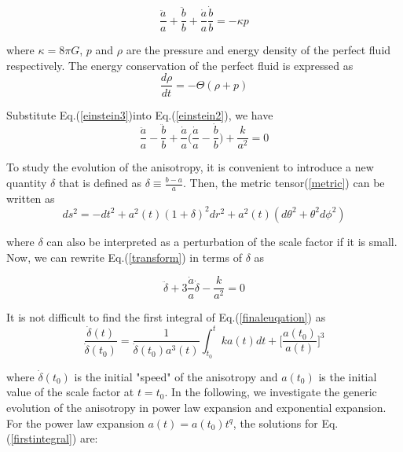 \documentclass[a4paper,preprint]{revtex4}
\begin{document}
\begin{equation}\label{einstein3}
  \frac{\ddot{a}}{a}+\frac{\ddot{b}}{b}+\frac{\dot{a}}{a}\frac{\dot{b}}{b}=-\kappa
  p
\end{equation}

\noindent where $\kappa=8\pi G$, $p$ and $\rho$ are the pressure
and energy density of the perfect fluid respectively. The energy
conservation of the perfect fluid is expressed as
\begin{equation}\label{conservation}
\frac{d \rho}{dt}=-\Theta (\rho+p)
\end{equation}


\noindent Substitute Eq.(\ref{einstein3})into
Eq.(\ref{einstein2}), we have
\begin{equation}\label{transform}
\frac{\ddot{a}}{a}-\frac{\ddot{b}}{b}+\frac{\dot{a}}{a}\Bigg(\frac{\dot{a}}
{a}-\frac{\dot{b}}{b}\Bigg)+\frac{k}{a^2}=0
\end{equation}

\noindent To study the evolution of the anisotropy, it is
convenient to introduce a new quantity $\delta$ that is defined as
$\delta\equiv\frac{b-a}{a}$. Then, the metric tensor(\ref{metric})
can be written as
\begin{equation}\label{newmetric}
ds^2=-dt^2+a^2(t)(1+\delta)^2dr^2+a^2(t)(d\theta^2+\theta^2d\phi^2)
\end{equation}

\noindent where $\delta$ can also be interpreted as a perturbation
of the scale factor if it is small. Now, we can rewrite
Eq.(\ref{transform}) in terms of $\delta$ as

\begin{equation}\label{finaleuqation}
\ddot{\delta}+3\frac{\dot{a}}{a}\dot{\delta}-\frac{k}{a^2}=0
\end{equation}

\noindent It is not difficult to find the first integral of
Eq.(\ref{finaleuqation}) as
\begin{equation}\label{firstintegral}
\frac{\dot{\delta}(t)}{\dot{\delta}(t_0)}=\frac{1}{\dot{\delta}(t_0)a^3(t)}
\int_{t_0}^{t}k a(t) dt + \bigg[\frac{a(t_0)}{a(t)}\bigg]^3
\end{equation}

\noindent where $\dot{\delta}(t_0)$ is the initial "speed" of the
anisotropy and $a(t_0)$ is the initial value of the scale factor
at $t=t_0$. In the following, we investigate the generic evolution
of the anisotropy in power law expansion and exponential
expansion. For the power law expansion $a(t)=a(t_0)t^q$, the
solutions for Eq.(\ref{firstintegral}) are:
\end{document}
